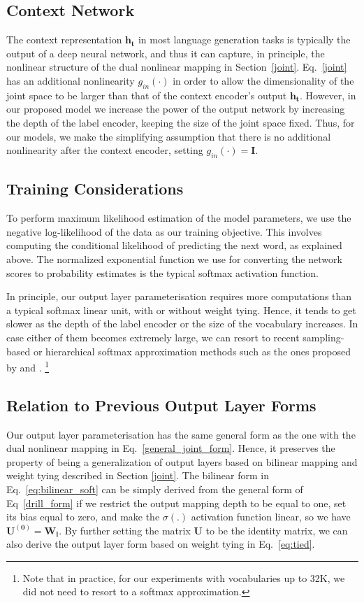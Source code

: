 \documentclass{article}
\begin{document}
\subsection{Context Network} 
The context representation $\mathbf{h_t}$ in most language generation tasks is typically the output of a deep neural network, and thus it can capture, in principle, the nonlinear structure of the dual nonlinear mapping in Section~\ref{joint}. Eq.~\ref{joint} has an additional nonlinearity $g_{in}(\cdot)$ in order to allow the dimensionality of the joint space to be larger than that of the context encoder's output $\mathbf{h_t}$.  However, in our proposed model we increase the power of the output network by increasing the depth of the label encoder, keeping the size of the joint space fixed.  Thus, for our models, we make the simplifying assumption that there is no additional nonlinearity after the context encoder, setting $g_{in}(\cdot) = \mathbf{I}$.
 
\subsection{Training Considerations}
To perform maximum likelihood estimation of the model parameters, we use the negative log-likelihood of the data as our training objective.  This involves computing the conditional likelihood of predicting the next word, as explained above. The normalized exponential function we use for converting the network scores to probability estimates is the typical softmax activation function. 

In principle, our output layer parameterisation requires more computations than a typical softmax linear unit, with or without weight tying.  Hence, it tends to get slower as the depth of the label encoder or the size of the vocabulary increases. In case either of them becomes extremely large, we can resort to recent sampling-based or hierarchical softmax approximation methods such as the ones proposed by \citet{softapprox2015} and \citet{grave17}.
\footnote{Note that in practice, for our experiments with vocabularies up to 32K, we did not need to resort to a softmax approximation.}

 
\subsection{Relation to Previous Output Layer Forms}
Our output layer parameterisation has the same general form as the one with the dual nonlinear mapping in Eq.~\ref{general_joint_form}.
Hence, it preserves the property of being a generalization of output layers based on bilinear mapping and weight tying described in Section \ref{joint}.
The bilinear form in Eq.~\ref{eq:bilinear_soft} can be simply derived from the general form of Eq~\ref{drill_form} if we restrict the output mapping depth to be equal to one, set its bias equal to zero, and make the $\sigma(.)$ activation function linear, so we have $\mathbf{U^{(0)}} = \mathbf{W_l}$.
By further setting the matrix $\mathbf{U}$ to be the identity matrix, we can also derive the output layer form based on weight tying in Eq.~\ref{eq:tied}.
\end{document}
